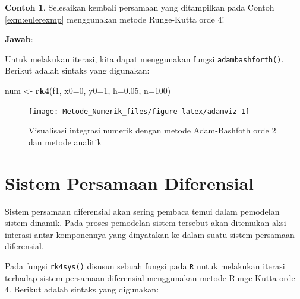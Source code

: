 \documentclass[
]{book}
\newenvironment{Shaded}{\begin{snugshade}}{\end{snugshade}}
\newcommand{\AttributeTok}[1]{\textcolor[rgb]{0.13,0.29,0.53}{#1}}
\newcommand{\DecValTok}[1]{\textcolor[rgb]{0.00,0.00,0.81}{#1}}
\newcommand{\FloatTok}[1]{\textcolor[rgb]{0.00,0.00,0.81}{#1}}
\newcommand{\FunctionTok}[1]{\textcolor[rgb]{0.13,0.29,0.53}{\textbf{#1}}}
\newcommand{\NormalTok}[1]{#1}
\newcommand{\OtherTok}[1]{\textcolor[rgb]{0.56,0.35,0.01}{#1}}
\theoremstyle{definition}
\theoremstyle{definition}
\newtheorem{example}{Contoh}[chapter]
\theoremstyle{definition}
\theoremstyle{definition}
\theoremstyle{remark}
\begin{document}
\begin{example}
\protect\hypertarget{exm:adamexmp}{}\label{exm:adamexmp}Selesaikan kembali persamaan yang ditampilkan pada Contoh \ref{exm:eulerexmp} menggunakan metode Runge-Kutta orde 4!
\end{example}

\textbf{Jawab}:

Untuk melakukan iterasi, kita dapat menggunakan fungsi \texttt{adambashforth()}. Berikut adalah sintaks yang digunakan:

\begin{Shaded}
\begin{Highlighting}[]
\NormalTok{num }\OtherTok{\textless{}{-}} \FunctionTok{rk4}\NormalTok{(f1, }\AttributeTok{x0=}\DecValTok{0}\NormalTok{, }\AttributeTok{y0=}\DecValTok{1}\NormalTok{, }\AttributeTok{h=}\FloatTok{0.05}\NormalTok{, }\AttributeTok{n=}\DecValTok{100}\NormalTok{)}
\end{Highlighting}
\end{Shaded}

\begin{figure}

{\centering \texttt{[image: Metode\_Numerik\_files/figure-latex/adamviz-1]} 

}

\caption{Visualisasi integrasi numerik dengan metode Adam-Bashfoth orde 2 dan metode analitik}\label{fig:adamviz}
\end{figure}

\hypertarget{sysdiff}{%
\section{Sistem Persamaan Diferensial}\label{sysdiff}}

Sistem persamaan diferensial akan sering pembaca temui dalam pemodelan sistem dinamik. Pada proses pemodelan sistem tersebut akan ditemukan aksi-interasi antar komponennya yang dinyatakan ke dalam suatu sistem persamaan diferensial.

Pada fungsi \texttt{rk4sys()} disusun sebuah fungsi pada \texttt{R} untuk melakukan iterasi terhadap sistem persamaan diferensial menggunakan metode Runge-Kutta orde 4. Berikut adalah sintaks yang digunakan:
\end{document}
